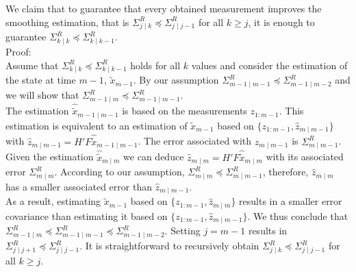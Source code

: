 \documentclass[oneside,12pt]{article}
\begin{document}
%
We claim that to guarantee that every obtained measurement improves the smoothing estimation, that is $\Sigma^R_{j \mid k} \preceq \Sigma^R_{j \mid j-1}$ for all $k \geq j$, it is enough to guarantee $\Sigma^R_{k \mid k} \preceq \Sigma^R_{k \mid k-1}$.\\
%
Proof:\\
%
Assume that $\Sigma^R_{k \mid k} \preceq \Sigma^R_{k \mid k-1}$ holds for all $k$ values and consider the estimation of the state at time $m-1$, $\tilde{x}_{m-1}$. By our assumption $\Sigma^R_{m-1 \mid m-1} \preceq \Sigma^R_{m-1 \mid m-2}$ and we will show that $\Sigma^R_{m-1 \mid m} \preceq \Sigma^R_{m-1 \mid m-1}$.\\
%
The estimation $\hat{\tilde{x}}_{m-1 \mid m-1}$ is based on the measurements $z_{1:m-1}$. This estimation is equivalent to an estimation of $\tilde{x}_{m-1}$ based on $\{z_{1:m-1},\hat{z}_{m \mid m-1}\}$ with $\hat{z}_{m \mid m-1} = H' F \hat{\tilde{x}}_{m-1 \mid m-1}$. The error associated with $\hat{z}_{m \mid m-1}$ is $\Sigma^R_{m \mid m-1}$.\\
%
Given the estimation $\hat{\tilde{x}}_{m \mid m}$ we can deduce $\hat{z}_{m \mid m} = H'F\hat{\tilde{x}}_{m \mid m}$ with its associated error $\Sigma^R_{m \mid m}$. According to our assumption, $\Sigma^R_{m \mid m} \preceq \Sigma^R_{m \mid m-1}$, therefore, $\hat{z}_{m \mid m}$ has a smaller associated error than $\hat{z}_{m \mid m-1}$.\\
%
As a result, estimating $\tilde{x}_{m-1}$ based on $\{z_{1:m-1},\hat{z}_{m \mid m}\}$ results in a smaller error covariance than estimating it based on $\{z_{1:m-1},\hat{z}_{m \mid m-1}\}$. We thus conclude that $\Sigma^R_{m-1 \mid m} \preceq \Sigma^R_{m-1 \mid m-1} \preceq \Sigma^R_{m-1 \mid m-2}$. Setting $j=m-1$ results in $\Sigma^R_{j \mid j+1} \preceq \Sigma^R_{j \mid j-1}$. It is straightforward to recursively obtain $\Sigma^R_{j \mid k} \preceq \Sigma^R_{j \mid j-1}$ for all $k \geq j$.   
%
%
%
\end{document}
